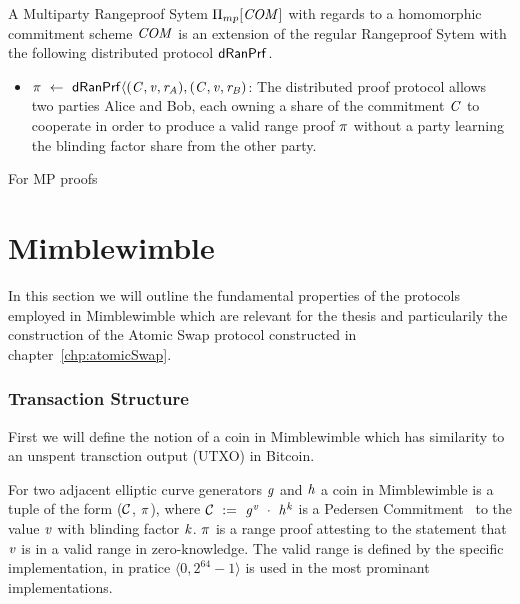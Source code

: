 \begin{definition}
    A Multiparty Rangeproof Sytem $\Pi_{mp}[\mathit{COM}]$ with regards to a homomorphic commitment scheme $\mathit{COM}$ is an extension of the regular Rangeproof Sytem with the following
    distributed protocol $\mathsf{dRanPrf}$.
    \begin{itemize}
        \item $\pi ~\leftarrow~ \mathsf{dRanPrf} \langle(\mathit{C},\mathit{v},\mathit{r}_{\mathit{A}}),(\mathit{C},\mathit{v},\mathit{r}_{\mathit{B}})$: The distributed proof protocol allows two parties Alice and Bob, each owning a share of the
        commitment $\mathit{C}$ to cooperate in order to produce a valid range proof $\pi$ without a party learning the blinding factor share from the other party.
    \end{itemize}
\end{definition}

For MP proofs \cite{klinec2020privacy}

\section{Mimblewimble} \label{sec:pre:mimblewimble}
In this section we will outline the fundamental properties of the protocols employed in Mimblewimble which are relevant for the thesis and particularily the construction of the Atomic Swap protocol constructed in chapter~\ref{chp:atomicSwap}.
\subsubsection{Transaction Structure} \label{subsec:pre:mimblwimble-tx}

First we will define the notion of a coin in Mimblewimble which has similarity to an unspent transction output (UTXO) in Bitcoin.
\begin{definition}\label{def:pre:coin}
    For two adjacent elliptic curve generators $\mathit{g}$ and $\mathit{h}$ a coin in Mimblewimble is a tuple of the form ($\mathcal{C}$, $\pi$), where $\mathcal{C} ~:=~ \mathit{g}^{\mathit{v}} ~\cdot~ \mathit{h}^{\mathit{k}}$ is a Pedersen Commitment~\cite{pedersen1991non}
    to the value $\mathit{v}$ with blinding factor $\mathit{k}$. $\pi$ is a range proof attesting to the statement that $\mathit{v}$ is in a valid range in zero-knowledge.
    The valid range is defined by the specific implementation, in pratice $\langle 0, 2^{64} -1 \rangle$ is used in the most prominant implementations.
\end{definition}

